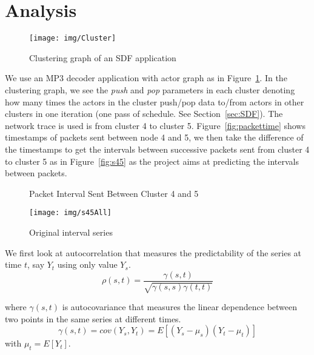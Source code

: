 \documentclass[12pt]{article}
\begin{document}
\section{Analysis}
\begin{figure}[ht!]
\centering
\texttt{[image: img/Cluster]}
\caption{Clustering graph of an SDF application}\label{fig:Cluster}
\end{figure}

We use an MP3 decoder application with actor graph as in
Figure~\ref{fig:Cluster}. In the clustering graph, we see the \textit{push} and
\textit{pop} parameters in each cluster denoting how many times the actors in
the cluster push/pop data to/from actors in other clusters in one iteration
(one pass of schedule. See Section~\ref{sec:SDF}). The network trace is used is
from cluster 4 to cluster 5. Figure~\ref{fig:packettime} shows timestamps of
packets sent between node 4 and 5, we then take the difference of the timestamps
to get the intervals between successive packets sent from cluster 4 to cluster 5
as in Figure~\ref{fig:s45} as the project aims at predicting the intervals between packets.

\begin{figure*}[ht!]
\centering
{}
\caption{Packet Interval Sent Between Cluster 4 and 5}
\end{figure*}

\begin{figure}[ht!]
\centering
\texttt{[image: img/s45All]}
\caption{Original interval series}\label{fig:s45All}
\end{figure}

We first look at autocorrelation that measures the predictability of the series
at time $t$, say $Y_t$ using only value $Y_s$.
\begin{equation}
\rho(s,t)=\frac{\gamma(s,t)}{\sqrt{\gamma(s,s)\gamma(t,t)}}
\end{equation}

where $\gamma(s,t)$ is autocovariance that measures the linear dependence
between two points in the same series at different times.
\begin{equation}
\gamma(s,t)=cov(Y_s, Y_t)=E[(Y_s-\mu_s)(Y_t-\mu_t)]
\end{equation}
with $\mu_t=E[Y_t]$.
\end{document}
